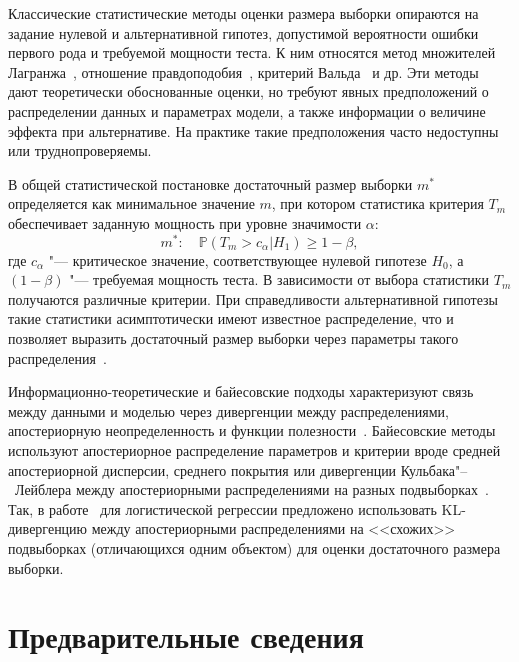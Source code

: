 Классические статистические методы оценки размера выборки опираются на задание нулевой и альтернативной гипотез, допустимой вероятности ошибки первого рода и требуемой мощности теста. К ним относятся метод множителей Лагранжа~\cite{self1988}, отношение правдоподобия~\cite{self1992,shieh2000}, критерий Вальда~\cite{shieh2005} и др. Эти методы дают теоретически обоснованные оценки, но требуют явных предположений о распределении данных и параметрах модели, а также информации о величине эффекта при альтернативе. На практике такие предположения часто недоступны или труднопроверяемы.

В общей статистической постановке достаточный размер выборки $m^*$ определяется как минимальное значение $m$, при котором статистика критерия $T_m$ обеспечивает заданную мощность при уровне значимости $\alpha$:
\[
m^*:\quad \mathbb P(T_m > c_\alpha | H_1)\ge 1-\beta,
\]
где $c_\alpha$ "--- критическое значение, соответствующее нулевой гипотезе $H_0$, а $(1-\beta)$ "--- требуемая мощность теста. В зависимости от выбора статистики $T_m$ получаются различные критерии. При справедливости альтернативной гипотезы такие статистики асимптотически имеют известное распределение, что и позволяет выразить достаточный размер выборки через параметры такого распределения~\cite{self1988,self1992,shieh2000,shieh2005}.

Информационно-теоретические и байесовские подходы характеризуют связь между данными и моделью через дивергенции между распределениями, апостериорную неопределенность и функции полезности~\cite{lindley1997,rubin1998,wang2002,motrenko2014}. Байесовские методы используют апостериорное распределение параметров и критерии вроде средней апостериорной дисперсии, среднего покрытия или дивергенции Кульбака"--~Лейблера между апостериорными распределениями на разных подвыборках~\cite{lindley1997,rubin1998,wang2002,motrenko2014}. Так, в работе~\cite{motrenko2014} для логистической регрессии предложено использовать KL-дивергенцию между апостериорными распределениями на <<схожих>> подвыборках (отличающихся одним объектом) для оценки достаточного размера выборки.

\section{Предварительные сведения}\label{sec:linear-preliminaries}

